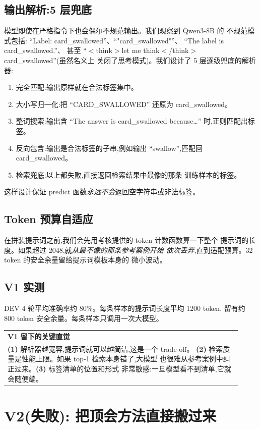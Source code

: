 \documentclass[10pt,twocolumn,letterpaper]{article}
\makeatletter
\newcommand{\insightbox}[2][\textbf{核心观察}]{%
  \par\medskip\noindent
  \begin{tabular}{@{}|@{\hspace{4pt}}p{0.92\linewidth}@{\hspace{4pt}}|@{}}
  \hline
  \rule{0pt}{2.6ex}\textbf{\color{insightclr}#1}\\[2pt]
  \small #2 \\[2pt]
  \hline
  \end{tabular}
  \par\medskip
}
\makeatother
\begin{document}
\subsection{输出解析:5 层兜底}
模型即使在严格指令下也会偶尔不规范输出。我们观察到 Qwen3-8B 的
不规范模式包括: ``Label: card\_swallowed''、``"card\_swallowed"''、
``The label is card\_swallowed.''、 甚至
``$<$think$>$let me think$<$/think$>$card\_swallowed''(虽然名义上
关闭了思考模式)。我们设计了 5 层逐级兜底的解析器:
\begin{enumerate}[leftmargin=*,itemsep=1pt,topsep=2pt]
\item 完全匹配:输出原样就在合法标签集中。
\item 大小写归一化:把 ``CARD\_SWALLOWED'' 还原为
  card\_swallowed。
\item 整词搜索:输出含 ``The answer is card\_swallowed because\dots''
  时,正则匹配出标签。
\item 反向包含:输出是合法标签的子串,例如输出
  ``swallow'',匹配回 card\_swallowed。
\item 检索兜底:以上都失败,直接返回检索结果中最像的那条
  训练样本的标签。
\end{enumerate}
这样设计保证 predict 函数\emph{永远不会}返回空字符串或非法标签。

\subsection{Token 预算自适应}
在拼装提示词之前,我们会先用考核提供的 token 计数函数算一下整个
提示词的长度。如果超过 2048,就\emph{从最不像的那条参考案例开始
依次丢弃},直到适配预算。32 token 的安全余量留给提示词模板本身的
微小波动。

\subsection{V1 实测}
DEV 4 轮平均准确率约 80\%。每条样本的提示词长度平均 1200 token,
留有约 800 token 安全余量。每条样本只调用一次大模型。

\insightbox[\textbf{V1 留下的关键直觉}]{%
\textbf{(1)} 解析器越宽容,提示词就可以越简洁,这是一个 trade-off。
\textbf{(2)} 检索质量是性能上限。如果 top-1 检索本身错了,大模型
也很难从参考案例中纠正过来。\textbf{(3)} 标签清单的位置和形式
非常敏感:一旦模型看不到清单,它就会随便编。
}

\section{V2(失败): 把顶会方法直接搬过来}
\label{sec:v2-fail}
\end{document}
